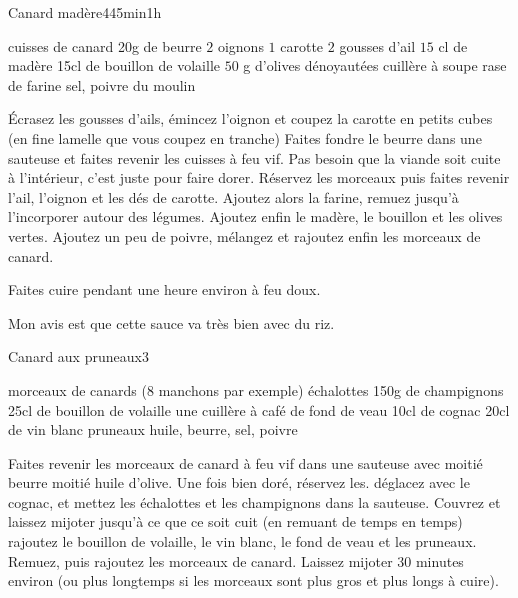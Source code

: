 \begin{recette}{Canard madère}{4}{45min}{1h}

\begin{ingredients}
 cuisses de canard
\ingredient 20g de beurre
\ingredient $2$ oignons
\ingredient $1$ carotte
\ingredient $2$ gousses d'ail
\ingredient $15$ cl de madère
\ingredient 15cl de bouillon de volaille
\ingredient $50$ g d'olives dénoyautées
 cuillère à soupe rase de farine
\ingredient sel, poivre du moulin
\end{ingredients}

\begin{preparation}
\etape Écrasez les gousses d'ails, émincez l'oignon et coupez la carotte en petits cubes (en fine lamelle que vous coupez en tranche)
\etape Faites fondre le beurre dans une sauteuse et faites revenir les cuisses à feu vif. Pas besoin que la viande soit cuite à l'intérieur, c'est juste pour faire dorer.
\etape Réservez les morceaux puis faites revenir l'ail, l'oignon et les dés de carotte.
\etape Ajoutez alors la farine, remuez jusqu'à l'incorporer autour des légumes. Ajoutez enfin le madère, le bouillon et les olives vertes. Ajoutez un peu de poivre, mélangez et rajoutez enfin les morceaux de canard.
\end{preparation}

\begin{cuisson}
Faites cuire pendant une heure environ à feu doux.
\end{cuisson}


\begin{remarque}
Mon avis est que cette sauce va très bien avec du riz.
\end{remarque}

\end{recette}

\begin{recette}{Canard aux pruneaux}{3}{}{}
\begin{ingredients}
\ingredient morceaux de canards (8 manchons par exemple)
 échalottes
\ingredient 150g de champignons
\ingredient 25cl de bouillon de volaille
\ingredient une cuillère à café de fond de veau
\ingredient 10cl de cognac
\ingredient 20cl de vin blanc
\ingredient pruneaux
\ingredient huile, beurre, sel, poivre
\end{ingredients}

\begin{preparation}
\etape Faites revenir les morceaux de canard à feu vif dans une sauteuse avec moitié beurre moitié huile d'olive. Une fois bien doré, réservez les.
\etape déglacez avec le cognac, et mettez les échalottes et les champignons dans la sauteuse. Couvrez et laissez mijoter jusqu'à ce que ce soit cuit (en remuant de temps en temps)
\etape rajoutez le bouillon de volaille, le vin blanc, le fond de veau et les pruneaux. Remuez, puis rajoutez les morceaux de canard.
\etape Laissez mijoter 30 minutes environ (ou plus longtemps si les morceaux sont plus gros et plus longs à cuire).
\end{preparation}

\end{recette}

